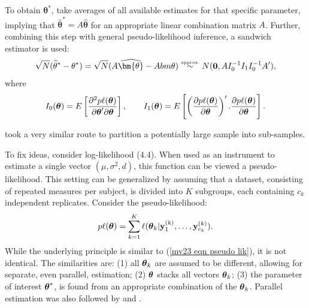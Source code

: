 \documentclass[11pt,a5paper,twoside]{book}
\newcommand{\bftheta}{\mbox{\boldmath $\theta$}}
\newcommand{\by}{{\bf y}}
\begin{document}
{To obtain $\bm{\theta}^*$, \cite{Verbeke2006} take averages of all available estimates for that specific parameter, implying that $\mathbf{\widehat{\theta}^*} = A \mathbf{\widehat{\theta}}$ for an appropriate linear combination matrix $A$. Further, combining this step with general pseudo-likelihood inference, a sandwich estimator is used:
\begin{equation}
\sqrt{N}(\mathbf{\widehat{\theta}^*}- \mathbf{\theta^*} )   =  \sqrt{N}(A\widehat{\bm{\theta}}- A \\bm{\theta}) \stackrel{\mbox{\tiny approx.}}{\sim}  N(\mathbf{0}, A I_0^{-1}I_1 I_0^{-1} A'), \label{mv23 distr psister}
\end{equation}
where
\begin{equation}
I_0(\bftheta)=E\left[\frac{\partial^2p\ell(\bftheta)}{\partial\bftheta'\partial\bftheta}\right],\qquad
I_1(\bftheta)=E\left[
\left(\frac{\partial p\ell(\bftheta)}{\partial\bftheta}\right)'.
\frac{\partial p\ell(\bftheta)}{\partial\bftheta}
\right].
\end{equation}


\cite{Iddi2011} took a very similar route to partition a potentially large sample into sub-samples.

To fix ideas, consider log-likelihood (4.4).
When used as an instrument to estimate a single vector $(\mu,\sigma^2,d)$, this function can be viewed a pseudo-likelihood. This setting can be generalized by assuming that a dataset, consisting of repeated measures per subject, is divided into $K$ subgroups, each containing $c_k$ independent replicates. Consider the pseudo-likelihood:
\begin{equation}
\label{ourgenpl}
p\ell(\bftheta)=\sum_{k=1}^K\ell(\bftheta_k|\by_1^{(k)},\dots,\by_{c_k}^{(k)}).
\end{equation}
While the underlying principle is similar to (\ref{mv23 eqn pseudo lik}), it 
is not identical. The similarities are: (1) all $\bftheta_k$ are assumed to 
be different, allowing for separate, even parallel, estimation; (2) 
$\bftheta$ stacks all vectors $\bftheta_k$; (3) the parameter of 
interest $\bftheta^\ast$, is found from an appropriate combination 
of the $\bftheta_k$. Parallel estimation was also followed 
by \cite{scott2016bayes} and \cite{neiswanger2013asymptotically}.



}
\end{document}
